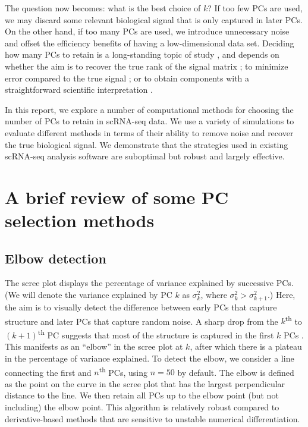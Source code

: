 \documentclass[10pt,letterpaper]{article}
\begin{document}
The question now becomes: what is the best choice of $k$?
If too few PCs are used, we may discard some relevant biological signal that is only captured in later PCs.
On the other hand, if too many PCs are used, we introduce unnecessary noise and offset the efficiency benefits of having a low-dimensional data set.
Deciding how many PCs to retain is a long-standing topic of study \cite{howard1963empirical,zwick1986comparison},
and depends on whether the aim is to recover the true rank of the signal matrix \cite{zwick1986comparison};
to minimize error compared to the true signal \cite{gavish2014optimal};
or to obtain components with a straightforward scientific interpretation \cite{franklin1995parallel}.

In this report, we explore a number of computational methods for choosing the number of PCs to retain in scRNA-seq data.
We use a variety of simulations to evaluate different methods in terms of their ability to remove noise and recover the true biological signal.
We demonstrate that the strategies used in existing scRNA-seq analysis software are suboptimal but robust and largely effective.

\section{A brief review of some PC selection methods}

\subsection{Elbow detection}
The scree plot displays the percentage of variance explained by successive PCs.
(We will denote the variance explained by PC $k$ as $\sigma^2_k$, where $\sigma^2_k > \sigma^2_{k+1}$.)
Here, the aim is to visually detect the difference between early PCs that capture structure and later PCs that capture random noise.
A sharp drop from the $k$\textsuperscript{th} to $(k+1)$\textsuperscript{th} PC suggests that most of the structure is captured in the first $k$ PCs \cite{cattell1966scree}.
This manifests as an ``elbow'' in the scree plot at $k$, after which there is a plateau in the percentage of variance explained.
To detect the elbow, we consider a line connecting the first and $n$\textsuperscript{th} PCs, using $n=50$ by default.
The elbow is defined as the point on the curve in the scree plot that has the largest perpendicular distance to the line.
We then retain all PCs up to the elbow point (but not including) the elbow point.
This algorithm is relatively robust compared to derivative-based methods that are sensitive to unstable numerical differentiation.
\end{document}
